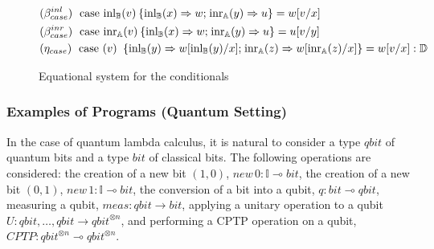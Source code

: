 \documentclass[10pt,a4paper]{amsart}
\theoremstyle{definition}
\theoremstyle{definition}
\theoremstyle{definition}
\theoremstyle{definition}
\theoremstyle{definition}
\theoremstyle{definition}
\begin{document}
  \begin{figure}[h!]
    \centering
    \begin{tcolorbox}[colframe=black, colback=white, boxrule=0.6pt, arc=1pt,boxsep=1pt,top=1pt,bottom=1pt, width=0.85 \textwidth]
    \begin{equation*}
        \begin{split}
          &(\beta_{case}^{inl}) \hspace{3pt} \text{ case } 
          \mathrm{inl}_{\mathbb{B}}(v) \hspace{2pt} \{ \mathrm{inl}_{\mathbb{B}} (x) \Rightarrow w 
          ; \hspace{1pt} \mathrm{inr}_{\mathbb{A}} (y) 
          \Rightarrow u\}= w[v/x]
          \\
          &(\beta_{case}^{inr}) \hspace{3pt} \text{ case } 
          \mathrm{inr}_{\mathbb{A}}(v) \hspace{2pt} \{ \mathrm{inl}_{\mathbb{B}} (x) \Rightarrow w 
          ; \hspace{1pt} \mathrm{inr}_{\mathbb{A}} (y) 
          \Rightarrow u\}= u[v/y]
          \\
          & (\eta_{case}) \hspace{3pt} \text{ case }(v)\ \hspace{2pt} \{\text{inl}_{\mathbb{B}} (y) \Rightarrow w [ \text{inl}_{\mathbb{B}}(y)/x] ; \hspace{1pt} \text{inr}_{\mathbb{A}} (z) \Rightarrow w [ \text{inr}_{\mathbb{A}}(z)/x]\} = w[v/x] : \mathbb{D}
        \end{split}
    \end{equation*}
    \end{tcolorbox}
    \caption{Equational system for the conditionals}
    \label{fig:equations-in-context-cond}
    \end{figure}


    \subsubsection{Examples of Programs (Quantum Setting)}

    \par\vspace{10pt} 
    
    
    In the case of quantum lambda calculus, it is natural to consider a  type $\textit{qbit}$ of quantum bits and a type $\textit{bit}$ of classical bits.  The following operations are considered: the creation of a new bit $(1,0)$, $\textit{new} \hspace{2pt} 0  :\mathbb{I}  \multimap \textit{bit} $, the creation of a new bit $(0,1)$, $\textit{new} \hspace{2pt} 1  :\mathbb{I}  \multimap \textit{bit} $, the conversion of a bit into a qubit, $q : \textit{bit}  \multimap \textit{qbit}$, measuring a qubit, $\textit{meas}:\textit{qbit} \xrightarrow{} \textit{bit}$, applying a unitary  operation to a qubit $\textit{U}:\textit{qbit},\ldots,\textit{qbit} \xrightarrow{} \textit{qbit}^{\otimes n}$, and performing a CPTP operation on a qubit, $\textit{CPTP}: \textit{qbit}^{\otimes n} \multimap \textit{qbit}^{\otimes n}$. 
\end{document}
